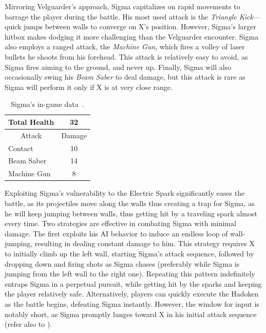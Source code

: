 Mirroring Velguarder's approach, Sigma capitalizes on rapid movements to barrage the player during the battle. His most used attack is the \emph{Triangle Kick}—quick jumps between walls to converge on X's position. However, Sigma's larger hitbox makes dodging it more challenging than the Velguarder encounter. Sigma also employs a ranged attack, the \emph{Machine Gun}, which fires a volley of laser bullets he shoots from his forehead. This attack is relatively easy to avoid, as Sigma fires aiming to the ground, and never up. Finally, Sigma will also occasionally swing his \emph{Beam Saber} to deal damage, but this attack is rare as Sigma will perform it only if X is at very close range.
\begin{table}[htp]
	\centering  
	\begin{tabular}[h]{l c}
		\toprule
		Total Health  & 32\\
		\midrule
		\multicolumn{1}{c}{Attack} & \multicolumn{1}{c}{Damage}\\
		Contact & 10\\
		Beam Saber & 14\\
		Machine Gun& 8\\
		\bottomrule
	\end{tabular}
	\caption{Sigma's in-game data~\cite{wiki:Sigma,book:Compendium}.}
\end{table}

Exploiting Sigma's vulnerability to the Electric Spark significantly eases the battle, as its projectiles move along the walls thus creating a trap for Sigma, as he will keep jumping between walls, thus getting hit by a traveling spark almost every time. Two strategies are effective in combating Sigma with minimal damage. The first exploits his AI behavior to induce an endless loop of wall-jumping, resulting in dealing constant damage to him. This strategy requires  X to initially climb up the left wall, starting Sigma's attack sequence, followed by dropping down and firing shots as Sigma chases (preferably while Sigma is jumping from the left wall to the right one). Repeating this pattern indefinitely entraps Sigma in a perpetual pursuit, while getting hit by the sparks and keeping the player relatively safe. Alternatively, players can quickly execute the Hadoken as the battle begins, defeating Sigma instantly. However, the window for input is notably short, as Sigma promptly lunges toward X in his initial attack sequence (refer also to ).



